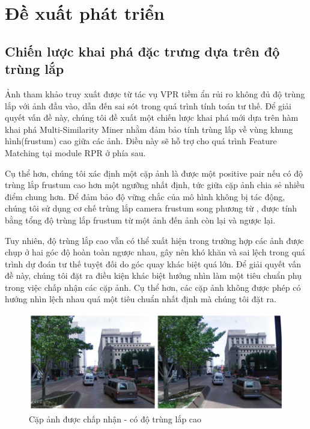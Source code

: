 \section{Đề xuất phát triển}

\subsection{Chiến lược khai phá đặc trưng dựa trên độ trùng lắp}
Ảnh tham khảo truy xuất được từ tác vụ VPR tiềm ẩn rủi ro không đủ độ trùng lắp với ảnh đầu vào, dẫn đến sai sót trong quá trình tính toán tư thế. Để giải quyết vấn đề này, chúng tôi đề xuất một chiến lược khai phá mới dựa trên hàm khai phá Multi-Similarity Miner \cite{wang2019multi} nhằm đảm bảo tính trùng lấp về vùng khung hình(frustum) cao giữa các ảnh. Điều này sẽ hỗ trợ cho quá trình Feature Matching tại module RPR ở phía sau.

Cụ thể hơn, chúng tôi xác định một cặp ảnh là được một positive pair nếu có độ trùng lắp frustum cao hơn một ngưỡng nhất định, tức giữa cặp ảnh chia sẻ nhiều điểm chung hơn. Để đảm bảo độ vững chắc của mô hình không bị tác động, chúng tôi sử dụng cơ chế trùng lắp camera frustum song phương từ \cite{9008579}, được tính bằng tổng độ trùng lắp frustum từ một ảnh đến ảnh còn lại và ngược lại.

Tuy nhiên, độ trùng lắp cao vẫn có thể xuất hiện trong trường hợp các ảnh được chụp ở hai góc độ hoàn toàn ngược nhau, gây nên khó khăn và sai lệch trong quá trình dự đoán tư thế tuyệt đối do góc quay khác biệt quá lớn. Để giải quyết vấn đề này, chúng tôi đặt ra điều kiện khác biệt hướng nhìn làm một tiêu chuẩn phụ trong việc chấp nhận các cặp ảnh. Cụ thể hơn, các cặp ảnh không được phép có hướng nhìn lệch nhau quá một tiêu chuẩn nhất định mà chúng tôi đặt ra.

\begin{figure}
  \centering
  \includegraphics[width=\textwidth]{pics/Chapter3/highoverlap.png}
  \caption[Cặp ảnh có độ overlap cao]{Cặp ảnh được chấp nhận - có độ trùng lắp cao}
\end{figure}

